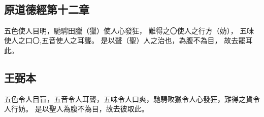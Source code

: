 ﻿%
%

\chapter{~}

\section{原道德經第十二章}

\begin{withgezhu}

\zhsong


五色使人目明，馳騁田臘（\textcolor{tongjia-color}{獵}）使人\colorbox{adding-color}{心發狂}，
難得之〇使人之行方（\textcolor{tongjia-color}{妨}），
五味使人之口〇,五音使人之耳\colorbox{missing-color}{聾}。
是以聲（\textcolor{tongjia-color}{聖}）人之治也，為腹不\colorbox{adding-color}{為目}，
故去罷耳此。

\end{withgezhu}

\section{王弼本}

\begin{withgezhu}

\zhsong

五色令人目盲，五音令人耳聾，五味令人口爽，馳騁畋獵令人心發狂，難得之貨令人行妨。
是以聖人為腹不為目，故去彼取此。

\end{withgezhu}
